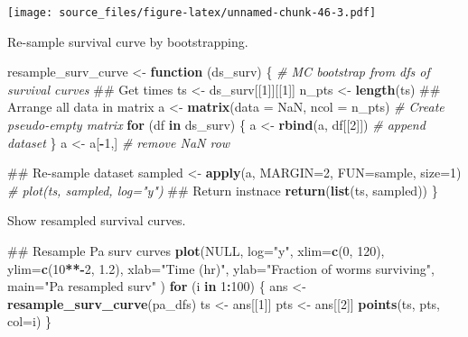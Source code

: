 \documentclass[]{article}
\newenvironment{Shaded}{\begin{snugshade}}{\end{snugshade}}
\newcommand{\KeywordTok}[1]{\textcolor[rgb]{0.13,0.29,0.53}{\textbf{#1}}}
\newcommand{\DataTypeTok}[1]{\textcolor[rgb]{0.13,0.29,0.53}{#1}}
\newcommand{\DecValTok}[1]{\textcolor[rgb]{0.00,0.00,0.81}{#1}}
\newcommand{\FloatTok}[1]{\textcolor[rgb]{0.00,0.00,0.81}{#1}}
\newcommand{\StringTok}[1]{\textcolor[rgb]{0.31,0.60,0.02}{#1}}
\newcommand{\CommentTok}[1]{\textcolor[rgb]{0.56,0.35,0.01}{\textit{#1}}}
\newcommand{\OtherTok}[1]{\textcolor[rgb]{0.56,0.35,0.01}{#1}}
\newcommand{\ControlFlowTok}[1]{\textcolor[rgb]{0.13,0.29,0.53}{\textbf{#1}}}
\newcommand{\OperatorTok}[1]{\textcolor[rgb]{0.81,0.36,0.00}{\textbf{#1}}}
\newcommand{\NormalTok}[1]{#1}
\begin{document}
\texttt{[image: source\_files/figure-latex/unnamed-chunk-46-3.pdf]}

Re-sample survival curve by bootstrapping.

\begin{Shaded}
\begin{Highlighting}[]
\NormalTok{resample_surv_curve <-}\StringTok{ }\ControlFlowTok{function}\NormalTok{ (ds_surv) \{}
  \CommentTok{# MC bootstrap from dfs of survival curves}
\NormalTok{  ## Get times}
\NormalTok{  ts <-}\StringTok{ }\NormalTok{ds_surv[[}\DecValTok{1}\NormalTok{]][[}\DecValTok{1}\NormalTok{]]}
\NormalTok{  n_pts <-}\StringTok{ }\KeywordTok{length}\NormalTok{(ts)}
\NormalTok{  ## Arrange all data in matrix}
\NormalTok{  a <-}\StringTok{ }\KeywordTok{matrix}\NormalTok{(}\DataTypeTok{data =} \OtherTok{NaN}\NormalTok{, }\DataTypeTok{ncol =}\NormalTok{ n_pts)  }\CommentTok{# Create pseudo-empty matrix}
  \ControlFlowTok{for}\NormalTok{ (df }\ControlFlowTok{in}\NormalTok{ ds_surv) \{}
\NormalTok{    a <-}\StringTok{ }\KeywordTok{rbind}\NormalTok{(a, df[[}\DecValTok{2}\NormalTok{]])  }\CommentTok{# append dataset}
\NormalTok{  \}}
\NormalTok{  a <-}\StringTok{ }\NormalTok{a[}\OperatorTok{-}\DecValTok{1}\NormalTok{,]  }\CommentTok{# remove NaN row}
  
\NormalTok{  ## Re-sample dataset}
\NormalTok{  sampled <-}\StringTok{ }\KeywordTok{apply}\NormalTok{(a, }\DataTypeTok{MARGIN=}\DecValTok{2}\NormalTok{, }\DataTypeTok{FUN=}\NormalTok{sample, }\DataTypeTok{size=}\DecValTok{1}\NormalTok{)}
  \CommentTok{# plot(ts, sampled, log="y")}
\NormalTok{  ## Return instnace}
  \KeywordTok{return}\NormalTok{(}\KeywordTok{list}\NormalTok{(ts, sampled))}
\NormalTok{\}}
\end{Highlighting}
\end{Shaded}

Show resampled survival curves.

\begin{Shaded}
\begin{Highlighting}[]
\NormalTok{## Resample Pa surv curves}
\KeywordTok{plot}\NormalTok{(}\OtherTok{NULL}\NormalTok{, }
     \DataTypeTok{log=}\StringTok{"y"}\NormalTok{, }
     \DataTypeTok{xlim=}\KeywordTok{c}\NormalTok{(}\DecValTok{0}\NormalTok{, }\DecValTok{120}\NormalTok{), }
     \DataTypeTok{ylim=}\KeywordTok{c}\NormalTok{(}\DecValTok{10}\OperatorTok{**-}\DecValTok{2}\NormalTok{, }\FloatTok{1.2}\NormalTok{),}
     \DataTypeTok{xlab=}\StringTok{"Time (hr)"}\NormalTok{,}
     \DataTypeTok{ylab=}\StringTok{"Fraction of worms surviving"}\NormalTok{,}
     \DataTypeTok{main=}\StringTok{"Pa resampled surv"}
\NormalTok{     )}
\ControlFlowTok{for}\NormalTok{ (i }\ControlFlowTok{in} \DecValTok{1}\OperatorTok{:}\DecValTok{100}\NormalTok{) \{}
\NormalTok{  ans <-}\StringTok{ }\KeywordTok{resample_surv_curve}\NormalTok{(pa_dfs)}
\NormalTok{  ts <-}\StringTok{ }\NormalTok{ans[[}\DecValTok{1}\NormalTok{]]}
\NormalTok{  pts <-}\StringTok{ }\NormalTok{ans[[}\DecValTok{2}\NormalTok{]]}
  \KeywordTok{points}\NormalTok{(ts, pts, }\DataTypeTok{col=}\NormalTok{i)}
\NormalTok{\}}
\end{Highlighting}
\end{Shaded}
\end{document}
